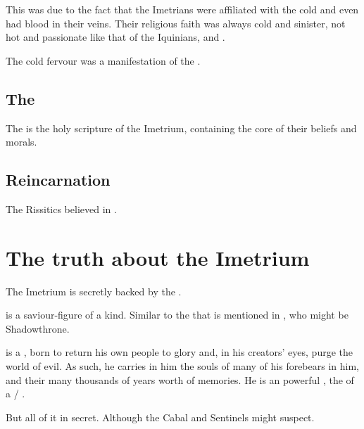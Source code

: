 This was due to the fact that the Imetrians were affiliated with the cold \nagae{} and even had \naga{} blood in their veins. 
Their religious faith was always cold and sinister, not hot and passionate like that of the Iquinians, \Ortaicans{} and \Tepharites. 

The cold fervour was a manifestation of the . 







\subsection{The \Imetriad}
\index{\Imetriad}
The \Imetriad{} is the holy scripture of the Imetrium, containing the core of their beliefs and morals. 









\subsection{Reincarnation}
The Rissitics believed in . 















\section{The truth about the Imetrium}
The Imetrium is secretly backed by the \nagae. 

\Sarokash is a saviour-figure of a kind. 
Similar to the \human{}  that is mentioned in \cite{StevenErikson:TheBonehunters}, who might be Shadowthrone. 

\Sarokash is a , born to return his own people to glory and, in his creators' eyes, purge the world of evil. 
As such, he carries in him the souls of many of his forebears in him, and their many thousands of years worth of memories. 
He is an powerful \vertex, the \apex{} of a \cuezcan/\naga{} \matrixx. 

But all of it in secret. 
Although the Cabal and Sentinels might suspect.





